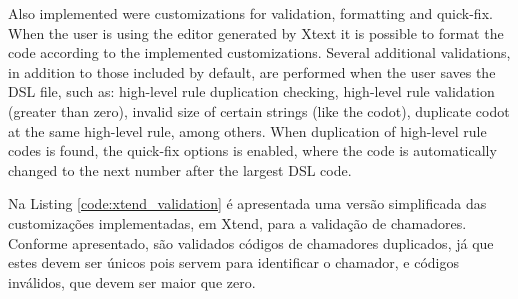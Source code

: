 
Also implemented were customizations for validation, formatting and quick-fix. When the user is using the editor generated by Xtext it is possible to format the code according to the implemented customizations. Several additional validations, in addition to those included by default, are performed when the user saves the DSL file, such as: high-level rule duplication checking, high-level rule validation (greater than zero), invalid size of certain strings (like the codot), duplicate codot at the same high-level rule, among others. When duplication of high-level rule codes is found, the quick-fix options is enabled, where the code is automatically changed to the next number after the largest DSL code.




Na Listing \ref{code:xtend_validation} é apresentada uma versão simplificada das customizações implementadas, em Xtend, para a validação de chamadores. %
Conforme apresentado, são validados códigos de chamadores duplicados, já que estes devem ser únicos pois servem para identificar o chamador, e códigos inválidos, que devem ser maior que zero.


